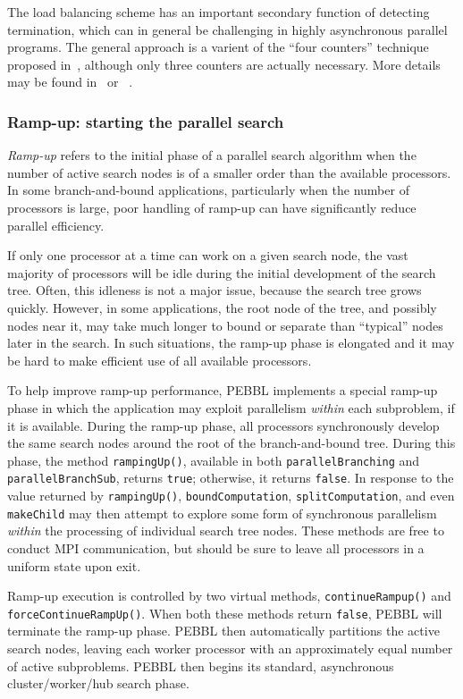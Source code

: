 The load balancing scheme has an important secondary function of
detecting termination, which can in general be challenging in highly
asynchronous parallel programs.  The general approach is a varient of
the ``four counters'' technique proposed in~\cite{Mat87}, although
only three counters are actually necessary.  More details may be found
in~\cite[Section 4.6]{EPH00} or ~\cite[Section 4.5]{EPH00a}.


\subsubsection{Ramp-up: starting the parallel search}
\label{sec:rampup}
\emph{Ramp-up} refers to the initial phase of a parallel search
algorithm when the number of active search nodes is of a smaller order
than the available processors.  In some branch-and-bound applications,
particularly when the number of processors is large, poor handling of
ramp-up can have significantly reduce parallel efficiency.

If only one processor at a time can work on a given search node, the
vast majority of processors will be idle during the initial
development of the search tree.  Often, this idleness is not a major
issue, because the search tree grows quickly.  However, in some
applications, the root node of the tree, and possibly nodes near
it, may take much longer to bound or separate than ``typical'' nodes
later in the search.  In such situations, the ramp-up phase is
elongated and it may be hard to make efficient use of all available
processors.

To help improve ramp-up performance, PEBBL implements
a special ramp-up phase in which the application may exploit
parallelism \emph{within} each subproblem, if it is available.  During
the ramp-up phase, all processors synchronously develop the same
search nodes around the root of the branch-and-bound tree.  During
this phase, the method \texttt{rampingUp()}, available in both
\texttt{parallelBranching} and \texttt{parallelBranchSub}, returns
\texttt{true}; otherwise, it returns \texttt{false}.  In response to
the value returned by \texttt{rampingUp()}, \texttt{boundComputation},
\texttt{splitComputation}, and even \texttt{makeChild} may then
attempt to explore some form of synchronous parallelism \emph{within} 
the processing of
individual search tree nodes.  These methods are free to conduct
MPI communication, but should be sure to leave all
processors in a uniform state upon exit.

Ramp-up execution is controlled by two virtual methods,
\texttt{continueRampup()} and
\texttt{force\linebreak[0]ContinueRampUp()}.  When both these methods
return \texttt{false}, PEBBL will terminate the ramp-up phase.  PEBBL
then automatically partitions the active search nodes, leaving each
worker processor with an approximately equal number of active
subproblems.  PEBBL then begins its standard, asynchronous
cluster/worker/hub search phase.

